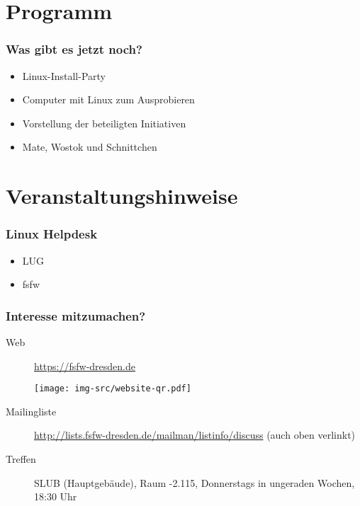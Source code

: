 \documentclass[t]{beamer}
\begin{document}
\section{Programm}
\begin{frame}
  \frametitle{Was gibt es jetzt noch?}
  \begin{itemize}
  \item Linux-Install-Party
  \item Computer mit Linux zum Ausprobieren
  \item Vorstellung der beteiligten Initiativen
  \item Mate, Wostok und Schnittchen
  \end{itemize}
\end{frame}

\section{Veranstaltungshinweise}
\begin{frame}
  \frametitle{Linux Helpdesk}
  \begin{itemize}
  \item LUG
  \item fsfw
  \end{itemize}
\end{frame}

\begin{frame}
  \frametitle{Interesse mitzumachen?}
  \begin{description}
  \item[Web] \url{https://fsfw-dresden.de}\\
    \begin{center}
      \hspace*{-6em}
      \texttt{[image: img-src/website-qr.pdf]}
    \end{center}
  \item[Mailingliste] \url{http://lists.fsfw-dresden.de/mailman/listinfo/discuss} (auch oben verlinkt)
  \item[Treffen] SLUB (Hauptgebäude), Raum -2.115, Donnerstags in ungeraden Wochen, 18:30 Uhr
  \end{description}
\end{frame}
\end{document}
